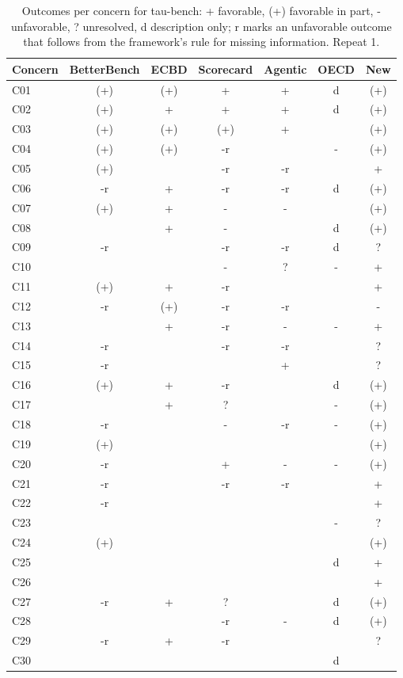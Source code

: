 \begin{table}[t]
\caption{Outcomes per concern for tau-bench: + favorable, (+) favorable in part, - unfavorable, ? unresolved, d description only; r marks an unfavorable outcome that follows from the framework's rule for missing information. Repeat 1.}
\label{tab:grid-tau-bench}
\small\centering\begin{tabular}{lcccccc}\toprule
Concern & BetterBench & ECBD & Scorecard & Agentic & OECD & New \\
\midrule
C01 & (+) & (+) & + & + & d & (+) \\
C02 & (+) & + & + & + & d & (+) \\
C03 & (+) & (+) & (+) & + &  & (+) \\
C04 & (+) & (+) & -r &  & - & (+) \\
C05 & (+) &  & -r & -r &  & + \\
C06 & -r & + & -r & -r & d & (+) \\
C07 & (+) & + & - & - &  & (+) \\
C08 &  & + & - &  & d & (+) \\
C09 & -r &  & -r & -r & d & ? \\
C10 &  &  & - & ? & - & + \\
C11 & (+) & + & -r &  &  & + \\
C12 & -r & (+) & -r & -r &  & - \\
C13 &  & + & -r & - & - & + \\
C14 & -r &  & -r & -r &  & ? \\
C15 & -r &  &  & + &  & ? \\
C16 & (+) & + & -r &  & d & (+) \\
C17 &  & + & ? &  & - & (+) \\
C18 & -r &  & - & -r & - & (+) \\
C19 & (+) &  &  &  &  & (+) \\
C20 & -r &  & + & - & - & (+) \\
C21 & -r &  & -r & -r &  & + \\
C22 & -r &  &  &  &  & + \\
C23 &  &  &  &  & - & ? \\
C24 & (+) &  &  &  &  & (+) \\
C25 &  &  &  &  & d & + \\
C26 &  &  &  &  &  & + \\
C27 & -r & + & ? &  & d & (+) \\
C28 &  &  & -r & - & d & (+) \\
C29 & -r & + & -r &  &  & ? \\
C30 &  &  &  &  & d &  \\
\bottomrule\end{tabular}
\end{table}
